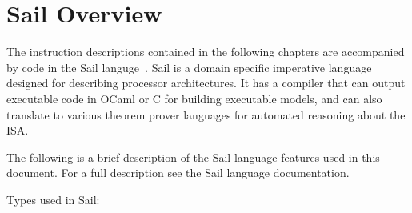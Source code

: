 \chapter{Sail Overview}
\label{chap:sail}

\newcommand{\isail}[1]{\lstinline[language=sail]{#1}}

The instruction descriptions contained in the following chapters are accompanied by code in the Sail languge~\cite{sail-popl2019,sail-url}.
Sail is
a domain specific imperative language designed for describing
processor architectures.  It has a compiler that can output executable
code in OCaml or C for building executable models, and can also
translate to various theorem prover languages for automated reasoning
about the ISA.

The following is a brief description of the Sail language features
used in this document. For a full description see the Sail
language documentation.

Types used in Sail:

